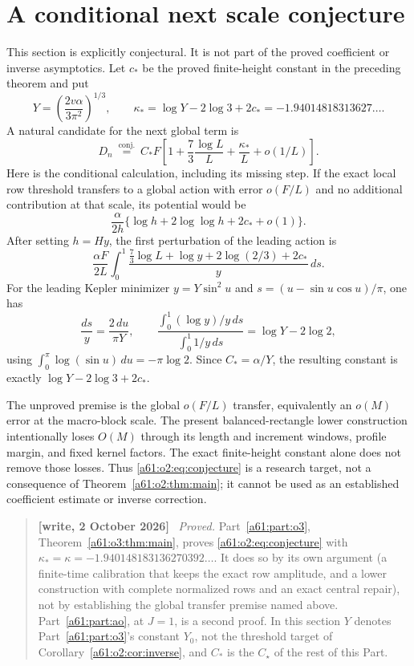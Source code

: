 \documentclass[11pt,letterpaper]{article}
\numberwithin{equation}{section}
\theoremstyle{remark}\newtheorem{remark}[theorem]{Remark}
\newcommand{\st}{\star}
\newenvironment{writenote}{\par\smallskip\begin{quote}\small\textbf{[write, 2 October 2026]}\ }{\end{quote}\smallskip}
\begin{document}
\section{A conditional next scale conjecture}
This section is explicitly conjectural. It is not part of the proved coefficient or inverse asymptotics.
Let $c_*$ be the proved finite-height constant in the preceding theorem and put
\[
 Y=\left(\frac{2v\alpha}{3\pi^2}\right)^{1/3},\qquad
 \kappa_* =\log Y-2\log3+2c_*
           =-1.94014818313627\ldots.
\]
A natural candidate for the next global term is
\begin{equation}\label{a61:o2:eq:conjecture}
 D_n\ \stackrel{\mathrm{conj.}}{=}\
 C_*F\left[1+\frac73\frac{\log L}{L}
                  +\frac{\kappa_*}{L}+o(1/L)\right].
\end{equation}
Here is the conditional calculation, including its missing step. If the exact local row threshold transfers to a global action with error $o(F/L)$ and no additional contribution at that scale, its potential would be
\[
 \frac{\alpha}{2h}\{\log h+2\log\log h+2c_*+o(1)\}.
\]
After setting $h=Hy$, the first perturbation of the leading action is
\[
 \frac{\alpha F}{2L}\int_0^1
 \frac{\tfrac73\log L+\log y+2\log(2/3)+2c_*}{y}\,ds.
\]
For the leading Kepler minimizer $y=Y\sin^2u$ and
$s=(u-\sin u\cos u)/\pi$, one has
\[
 \frac{ds}{y}=\frac{2\,du}{\pi Y},\qquad
 \frac{\int_0^1(\log y)/y\,ds}{\int_0^1 1/y\,ds}
   =\log Y-2\log2,
\]
using $\int_0^\pi\log(\sin u)\,du=-\pi\log2$.
Since $C_* =\alpha/Y$, the resulting constant is exactly
$\log Y-2\log3+2c_*$.

The unproved premise is the global $o(F/L)$ transfer, equivalently an $o(M)$ error at the macro-block scale. The present balanced-rectangle lower construction intentionally loses $O(M)$ through its length and increment windows, profile margin, and fixed kernel factors. The exact finite-height constant alone does not remove those losses. Thus \eqref{a61:o2:eq:conjecture} is a research target, not a consequence of Theorem~\ref{a61:o2:thm:main}; it cannot be used as an established coefficient estimate or inverse correction.
\begin{writenote}
\emph{Proved.} Part~\ref{a61:part:o3}, Theorem~\ref{a61:o3:thm:main}, proves \eqref{a61:o2:eq:conjecture} with $\kappa_*=\kappa=-1.940148183136270392\ldots$. It does so by its own argument (a finite-time calibration that keeps the exact row amplitude, and a lower construction with complete normalized rows and an exact central repair), not by establishing the global transfer premise named above. Part~\ref{a61:part:ao}, at $J=1$, is a second proof. In this section $Y$ denotes Part~\ref{a61:part:o3}'s constant $Y_0$, not the threshold target of Corollary~\ref{a61:o2:cor:inverse}, and $C_*$ is the $C_\st$ of the rest of this Part.
\end{writenote}
\end{document}
